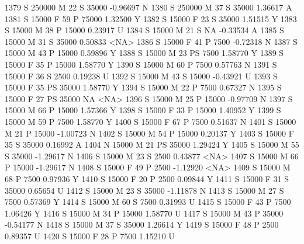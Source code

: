 \documentclass{article}
\begin{document}
\begin{Schunk}
\begin{Soutput}
1379      S     250000   M  22         S  35000  -0.96697    N
1380      S     250000   M  37         S  35000   1.36617    A
1381      S      15000   F  59         P  75000   1.32500    Y
1382      S      15000   F  23         S  35000   1.51515    Y
1383      S      15000   M  38         P  15000   0.23917    U
1384      S      15000   M  21         S     NA  -0.33534    A
1385      S      15000   M  31         S  35000   0.50833 <NA>
1386      S      15000   F  41         P   7500  -0.72318    N
1387      S      15000   M  43         P  15000   0.59896    Y
1388      S      15000   M  23        PS   7500   1.58770    Y
1389      S      15000   F  35         P  15000   1.58770    Y
1390      S      15000   M  60         P   7500   0.57763    N
1391      S      15000   F  36         S   2500   0.19238    U
1392      S      15000   M  43         S  15000  -0.43921    U
1393      S      15000   F  35        PS  35000   1.58770    Y
1394      S      15000   M  22         P   7500   0.67327    N
1395      S      15000   F  27        PS  35000        NA <NA>
1396      S      15000   M  25         P  15000  -0.97709    N
1397      S      15000   M  66         P  15000   1.57366    Y
1398      S      15000   F  33         P  15000   1.40952    Y
1399      S      15000   M  59         P   7500   1.58770    Y
1400      S      15000   F  67         P   7500   0.51637    N
1401      S      15000   M  21         P  15000  -1.00723    N
1402      S      15000   M  54         P  15000   0.20137    Y
1403      S      15000   F  35         S  35000   0.16992    A
1404      N      15000   M  21        PS  35000   1.29424    Y
1405      S      15000   M  55         S  35000  -1.29617    N
1406      S      15000   M  23         S   2500   0.43877 <NA>
1407      S      15000   M  66         P  15000  -1.29617    N
1408      S      15000   F  49         P   2500  -1.12920 <NA>
1409      S      15000   M  68         P   7500   0.97936    Y
1410      S      15000   F  20         P   2500   0.09844    Y
1411      S      15000   F  31         S  35000   0.65654    U
1412      S      15000   M  23         S  35000  -1.11878    N
1413      S      15000   M  27         S   7500   0.57369    Y
1414      S      15000   M  60         S   7500   0.31993    U
1415      S      15000   F  43         P   7500   1.06426    Y
1416      S      15000   M  34         P  15000   1.58770    U
1417      S      15000   M  43         P  35000  -0.54177    N
1418      S      15000   M  37         S  35000   1.26614    Y
1419      S      15000   F  48         P   2500   0.89357    U
1420      S      15000   F  28         P   7500   1.15210    U

\end{Soutput}
\end{Schunk}
\end{document}
